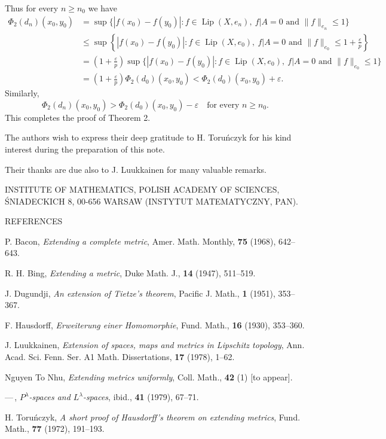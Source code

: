 \documentclass[11pt,a4paper,leqno,twoside]{article}
\newcommand{\Lip}{\operatorname{Lip}}
\newcommand{\norm}[1]{\lVert#1\rVert}
\newcommand{\restr}{\vert}
\begin{document}
Thus for every $n\geq n_0$ we have
\[
\begin{aligned}
\Phi_2(d_n)(x_0,y_0)
&=\sup\{|f(x_0)-f(y_0)|:f\in\Lip(X,e_n),\ f\restr A=0\text{ and }\norm f_{e_n}\leq1\}\\[6pt]
&\leq\sup\left\{|f(x_0)-f(y_0)|:f\in\Lip(X,e_0),\ f\restr A=0\text{ and }\norm f_{e_0}\leq1+\frac\varepsilon p\right\}\\[6pt]
&=\left(1+\frac\varepsilon p\right)\sup\{|f(x_0)-f(y_0)|:f\in\Lip(X,e_0),\ f\restr A=0\text{ and }\norm f_{e_0}\leq1\}\\[6pt]
&=\left(1+\frac\varepsilon p\right)\Phi_2(d_0)(x_0,y_0)<\Phi_2(d_0)(x_0,y_0)+\varepsilon.
\end{aligned}
\]
Similarly,
\[\Phi_2(d_n)(x_0,y_0)>\Phi_2(d_0)(x_0,y_0)-\varepsilon\quad\text{for every }n\geq n_0.\]
This completes the proof of Theorem 2.

\medskip
The authors wish to express their deep gratitude to H. Toru\'nczyk for his kind interest during the preparation of this note.

Their thanks are due also to J. Luukkainen for many valuable remarks.

\medskip
{\footnotesize\noindent INSTITUTE OF MATHEMATICS, POLISH ACADEMY OF SCIENCES, \'SNIADECKICH 8, 00-656 WARSAW (INSTYTUT MATEMATYCZNY, PAN).\par}

\medskip\noindent REFERENCES
\begin{enumerate}[label={[\arabic*]},leftmargin=2em,itemsep=3pt,topsep=7pt,parsep=0pt]
\item P. Bacon, \textit{Extending a complete metric}, Amer. Math. Monthly, \textbf{75} (1968), 642--643.
\item R. H. Bing, \textit{Extending a metric}, Duke Math. J., \textbf{14} (1947), 511--519.
\item J. Dugundji, \textit{An extension of Tietze's theorem}, Pacific J. Math., \textbf{1} (1951), 353--367.
\item F. Hausdorff, \textit{Erweiterung einer Homomorphie}, Fund. Math., \textbf{16} (1930), 353--360.
\item J. Luukkainen, \textit{Extension of spaces, maps and metrics in Lipschitz topology}, Ann. Acad. Sci. Fenn. Ser. A1 Math. Dissertations, \textbf{17} (1978), 1--62.
\item Nguyen To Nhu, \textit{Extending metrics uniformly}, Coll. Math., \textbf{42} (1) [to appear].
\item ---\,, \textit{$P^\lambda$-spaces and $L^\lambda$-spaces}, ibid., \textbf{41} (1979), 67--71.
\item H. Toru\'nczyk, \textit{A short proof of Hausdorff's theorem on extending metrics}, Fund. Math., \textbf{77} (1972), 191--193.
\end{enumerate}
\end{document}
